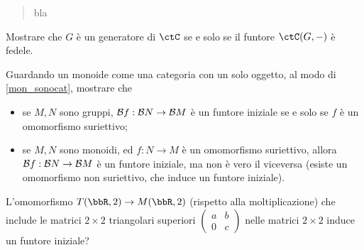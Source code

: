 \begin{esercizi}
\begin{quote}
		bla
	\end{quote}
	Mostrare che \(G\) è un generatore di \(\ctC\) se e solo se il funtore \(\Hom\ctC(G,-)\) è fedele.
	\item \label{ex_monepi_5} Guardando un monoide come una categoria con un solo oggetto, al modo di \ref{mon_sonocat}, mostrare che
	\begin{itemize}
		\item se \(M,N\) sono gruppi, \(\mathcal{B} f : \mathcal{B} N\to \mathcal{B} M\) è un funtore iniziale se e solo se \(f\) è un omomorfismo suriettivo;
		\item se \(M,N\) sono monoidi, ed \(f : N\to M\) è un omomorfismo suriettivo, allora \(\mathcal{B} f : \mathcal{B} N\to \mathcal{B} M\) è un funtore iniziale, ma non è vero il viceversa (esiste un omomorfismo non suriettivo, che induce un funtore iniziale). %
	\end{itemize}
	L'omomorfismo \(T(\bbR,2) \to M(\bbR,2)\) (rispetto alla moltiplicazione) che include le matrici \(2\times 2\) triangolari superiori \(\left(\begin{smallmatrix} a	&	b\\ 0 & c		\end{smallmatrix}\right)\)	nelle matrici \(2\times 2\) induce un funtore iniziale?
\end{esercizi}